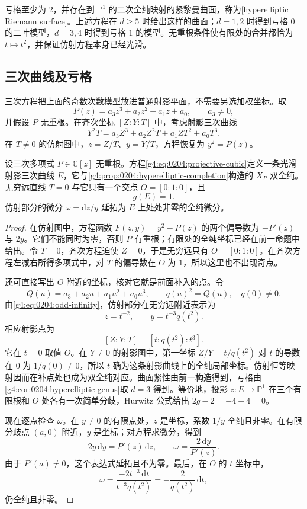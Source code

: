 亏格至少为 \(2\)，并存在到 \(\mathbb P^1\) 的二次全纯映射的紧黎曼曲面，称为[hyperelliptic Riemann surface]。上述方程在 \(d\ge5\) 时给出这样的曲面；\(d=1,2\) 时得到亏格 \(0\) 的二叶模型，\(d=3,4\) 时得到亏格 \(1\) 的模型。无重根条件使有限处的合并都恰为 \(t\mapsto t^2\)，并保证仿射方程本身已经光滑。

\subsection{三次曲线及亏格}
\label{g4:subsec:0204:02}

三次方程把上面的奇数次数模型放进普通射影平面，不需要另选加权坐标。取
\[
	P(z)=a_3z^3+a_2z^2+a_1z+a_0,\qquad a_3\ne0,
\]
并假设 \(P\) 无重根。在齐次坐标 \([Z:Y:T]\) 中，考虑射影三次曲线
\begin{equation}\label{g4:eq:0204:projective-cubic}
	Y^2T=a_3Z^3+a_2Z^2T+a_1ZT^2+a_0T^3.
\end{equation}
在 \(T\ne0\) 的仿射图中，\(z=Z/T\)、\(y=Y/T\)，方程恢复为 \(y^2=P(z)\)。

\begin{proposition}\label{g4:prop:0204:cubic}
	设三次多项式 \(P\in\mathbb C[z]\) 无重根。方程\eqref{g4:eq:0204:projective-cubic}定义一条光滑射影三次曲线 \(E\)，它与\cref{g4:prop:0204:hyperelliptic-completion}构造的 \(X_P\) 双全纯。无穷远直线 \(T=0\) 与它只有一个交点 \(O=[0:1:0]\)，且
	\[
		g(E)=1.
	\]
	仿射部分的微分 \(\omega=\mathrm{d}z/y\) 延拓为 \(E\) 上处处非零的全纯微分。
\end{proposition}
\begin{proof}
	在仿射图中，方程函数 \(F(z,y)=y^2-P(z)\) 的两个偏导数为 \(-P'(z)\) 与 \(2y\)。它们不能同时为零，否则 \(P\) 有重根；有限处的全纯坐标已经在前一命题中给出。令 \(T=0\)，齐次方程迫使 \(Z=0\)，于是无穷远只有 \(O=[0:1:0]\)。在齐次方程左减右所得多项式中，对 \(T\) 的偏导数在 \(O\) 为 \(1\)，所以这里也不出现奇点。

	还可直接写出 \(O\) 附近的坐标，核对它就是前面补入的点。令
	\[
		Q(u)=a_3+a_2u+a_1u^2+a_0u^3,\qquad q(u)^2=Q(u),\quad q(0)\ne0.
	\]
	由\eqref{g4:eq:0204:odd-infinity}，仿射部分在无穷远附近表示为
	\[
		z=t^{-2},\qquad y=t^{-3}q(t^2).
	\]
	相应射影点为
	\[
		[Z:Y:T]=[t:q(t^2):t^3].
	\]
	它在 \(t=0\) 取值 \(O\)。在 \(Y\ne0\) 的射影图中，第一坐标 \(Z/Y=t/q(t^2)\) 对 \(t\) 的导数在 \(0\) 为 \(1/q(0)\ne0\)，所以 \(t\) 确为这条射影曲线上的全纯局部坐标。仿射恒等映射因而在补点处也成为双全纯对应。曲面紧性由前一构造得到，亏格由\cref{g4:cor:0204:hyperelliptic-genus}取 \(d=3\) 得到。等价地，投影 \(z:E\to\mathbb P^1\) 在三个有限根和 \(O\) 处各有一次简单分歧，Hurwitz 公式给出 \(2g-2=-4+4=0\)。

	现在逐点检查 \(\omega\)。在 \(y\ne0\) 的有限点处，\(z\) 是坐标，系数 \(1/y\) 全纯且非零。在有限分歧点 \((a,0)\) 附近，\(y\) 是坐标；对方程求微分，得到
	\[
		2y\,\mathrm{d}y=P'(z)\,\mathrm{d}z,
		\qquad
		\omega=\frac{2\,\mathrm{d}y}{P'(z)}.
	\]
	由于 \(P'(a)\ne0\)，这个表达式延拓且不为零。最后，在 \(O\) 的 \(t\) 坐标中，
	\[
		\omega
		=\frac{-2t^{-3}\,\mathrm{d}t}{t^{-3}q(t^2)}
		=-\frac{2}{q(t^2)}\,\mathrm{d}t,
	\]
	仍全纯且非零。
\end{proof}

